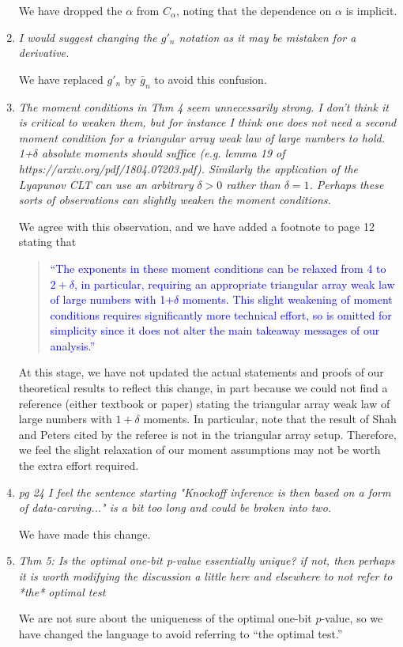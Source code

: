 \documentclass[12pt]{article}
\begin{document}
\begin{enumerate}
	We have dropped the $\alpha$ from $C_\alpha$, noting that the dependence on $\alpha$ is implicit.

	\item \textsl{I would suggest changing the $g'_n$ notation as it may be mistaken for a derivative.}
	
	We have replaced $g'_n$ by $\bar g_n$ to avoid this confusion.

	\item \textsl{The moment conditions in Thm 4 seem unnecessarily strong. I don't think it is critical to weaken them, but for instance I think one does not need a second moment condition for a triangular array weak law of large numbers to hold. 1+$\delta$ absolute moments should suffice (e.g. lemma 19 of https://arxiv.org/pdf/1804.07203.pdf). Similarly the application of the Lyapunov CLT can use an arbitrary $\delta > 0$ rather than $\delta=1$. Perhaps these sorts of observations can slightly weaken the moment conditions.}
	
	We agree with this observation, and we have added a footnote to page 12 stating that
	\begin{quote}
	\textcolor{blue}{``The exponents in these moment conditions can be relaxed from 4 to $2+\delta$, in particular, requiring an appropriate triangular array weak law of large numbers with 1+$\delta$ moments. This slight weakening of moment conditions requires significantly more technical effort, so is omitted for simplicity since it does not alter the main takeaway messages of our analysis.''}
	\end{quote}
	At this stage, we have not updated the actual statements and proofs of our theoretical results to reflect this change, in part because we could not find a reference (either textbook or paper) stating the triangular array weak law of large numbers with $1+\delta$ moments. In particular, note that the result of Shah and Peters cited by the referee is not in the triangular array setup. Therefore, we feel the slight relaxation of our moment assumptions may not be worth the extra effort required. %

	\item \textsl{pg 24 I feel the sentence starting "Knockoff inference is then based on a form of data-carving..." is a bit too long and could be broken into two.}
	
	We have made this change. 

	\item \textsl{Thm 5: Is the optimal one-bit p-value essentially unique? if not, then perhaps it is worth modifying the discussion a little here and elsewhere to not refer to *the* optimal test}
	
	We are not sure about the uniqueness of the optimal one-bit $p$-value, so we have changed the language to avoid referring to ``the optimal test.''

\end{enumerate}
\end{document}
